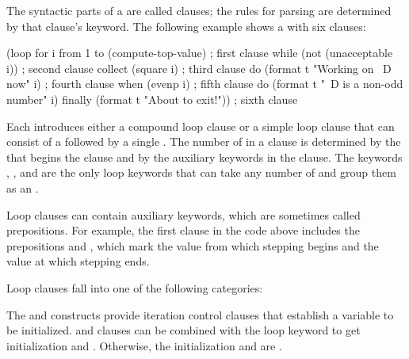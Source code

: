 \endsubsubsubsubsection%

\endsubsubsubsection%

\endsubsubsection%

 
The syntactic parts of a   are called clauses; 
the rules for parsing are determined by 
that clause's keyword.
The following example shows a   with six clauses:
 
\code
 (loop for i from 1 to (compute-top-value)       ; first clause
       while (not (unacceptable i))              ; second clause
       collect (square i)                        ; third clause
       do (format t "Working on ~D now" i)       ; fourth clause
       when (evenp i)                            ; fifth clause
         do (format t "~D is a non-odd number" i)
       finally (format t "About to exit!"))      ; sixth clause
\endcode
 
Each  introduces 
either a compound loop clause or a simple loop clause
that can consist of a  followed by a single .
The number of  in a clause is determined by the  
that begins the clause and by the auxiliary keywords in the clause.
The keywords , , and  
are the only loop keywords that can take any number of  and 
group them as an .

Loop clauses can contain auxiliary keywords, which are sometimes
called prepositions.  For example, the first clause in the code
above includes the prepositions  and , 
which mark the value from which stepping begins and the value at which stepping
ends.
\endsubsubsection%
 
 
Loop clauses fall into one of the following categories:
 

\beginlist          

\itemitem{--}  
  The  and  constructs provide iteration control clauses
  that establish a variable to be initialized.
   and  clauses can be combined with the loop
  keyword  to get  initialization and .
  Otherwise, the initialization and  are .

